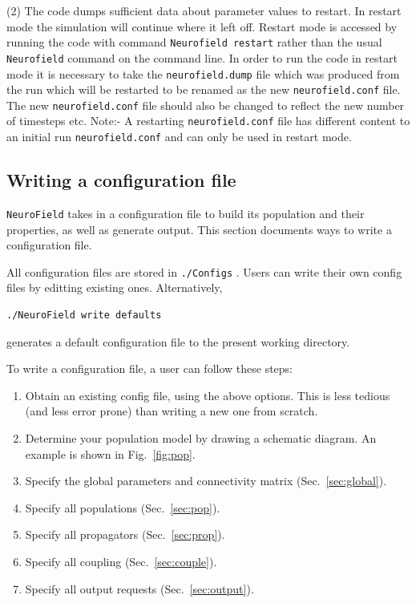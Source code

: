 \documentclass[12pt,a4paper]{article}
\newcommand{\type}[1]{ {\small\small\tt #1} }
\begin{document}
(2) The code dumps sufficient data about parameter values to restart. In restart mode the simulation will continue where it left off. Restart mode is accessed by running the code with command \type{Neurofield restart} rather than the usual \type{Neurofield} command on the command line. In order to run the code in restart mode it is necessary to take the \type{neurofield.dump} file which was produced from the run which will be restarted to be renamed as the new \type{neurofield.conf} file. The new \type{neurofield.conf} file should also be changed to reflect the new number of timesteps etc.  Note:- A restarting \type{neurofield.conf} file has different content to an initial run \type{neurofield.conf} and can only be used in restart mode.

\subsection{Writing a configuration file}

\type{NeuroField} takes in a configuration file to build its population and their properties, as well as generate output. This section documents ways to write a configuration file.

All configuration files are stored in \type{./Configs}. Users can write their own config files by editting existing ones. Alternatively,
\begin{lstlisting}
./NeuroField write defaults
\end{lstlisting}
generates a default configuration file to the present working directory.

To write a configuration file, a user can follow these steps:
\begin{enumerate}
\item Obtain an existing config file, using the above options. This is less tedious (and less error prone) than writing a new one from scratch.
\item Determine your population model by drawing a schematic diagram. An example is shown in Fig.~\ref{fig:pop}.
\item Specify the global parameters and connectivity matrix (Sec.~\ref{sec:global}).
\item Specify all populations (Sec.~\ref{sec:pop}).
\item Specify all propagators (Sec.~\ref{sec:prop}).
\item Specify all coupling (Sec.~\ref{sec:couple}).
\item Specify all output requests (Sec.~\ref{sec:output}).
\end{enumerate}
\end{document}
